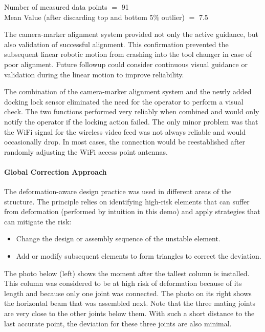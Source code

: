 \documentclass[11pt]{book}
\begin{document}
{\footnotesize Number of measured data points $=$ 91 \\ Mean Value (after discarding top and bottom 5$\%$ outlier) $=$ 7.5}

The camera-marker alignment system provided not only the active guidance, but also validation of successful alignment. This confirmation prevented the subsequent linear robotic motion from crashing into the tool changer in case of poor alignment. Future followup could consider continuous visual guidance or validation during the linear motion to improve reliability.

The combination of the camera-marker alignment system and the newly added docking lock sensor eliminated the need for the operator to perform a visual check. The two functions performed very reliably when combined and would only notify the operator if the locking action failed. The only minor problem was that the WiFi signal for the wireless video feed was not always reliable and would occasionally drop. In most cases, the connection would be reestablished after randomly adjusting the WiFi access point antennas. 

\paragraph{Global Correction Approach}

The deformation-aware design practice was used in different areas of the structure. The principle relies on identifying high-risk elements that can suffer from deformation (performed by intuition in this demo) and apply strategies that can mitigate the risk:

\begin{itemize}
	\item Change the design or assembly sequence of the unstable element.

	\item Add or modify subsequent elements to form triangles to correct the deviation.

\end{itemize}
The photo below (left) shows the moment after the tallest column is installed. This column was considered to be at high risk of deformation because of its length and because only one joint was connected. The photo on its right shows the horizontal beam that was assembled next. Note that the three mating joints are very close to the other joints below them. With such a short distance to the last accurate point, the deviation for these three joints are also minimal. 
\end{document}
